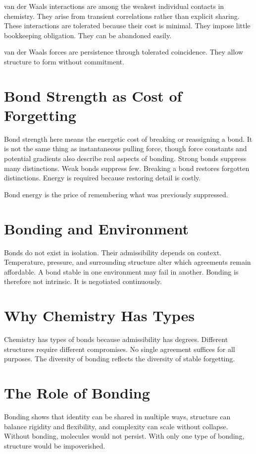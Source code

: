 \documentclass[11pt,twoside,openright]{book}
\begin{document}
van der Waals interactions are among the weakest individual contacts in chemistry. They arise from transient correlations rather than explicit sharing. These interactions are tolerated because their cost is minimal. They impose little bookkeeping obligation. They can be abandoned easily.

van der Waals forces are persistence through tolerated coincidence. They allow structure to form without commitment.

\section*{Bond Strength as Cost of Forgetting}

Bond strength here means the energetic cost of breaking or reassigning a bond. It is not the same thing as instantaneous pulling force, though force constants and potential gradients also describe real aspects of bonding. Strong bonds suppress many distinctions. Weak bonds suppress few. Breaking a bond restores forgotten distinctions. Energy is required because restoring detail is costly.

Bond energy is the price of remembering what was previously suppressed.

\section*{Bonding and Environment}

Bonds do not exist in isolation. Their admissibility depends on context. Temperature, pressure, and surrounding structure alter which agreements remain affordable. A bond stable in one environment may fail in another. Bonding is therefore not intrinsic. It is negotiated continuously.

\section*{Why Chemistry Has Types}

Chemistry has types of bonds because admissibility has degrees. Different structures require different compromises. No single agreement suffices for all purposes. The diversity of bonding reflects the diversity of stable forgetting.

\section*{The Role of Bonding}

Bonding shows that identity can be shared in multiple ways, structure can balance rigidity and flexibility, and complexity can scale without collapse. Without bonding, molecules would not persist. With only one type of bonding, structure would be impoverished.
\end{document}
